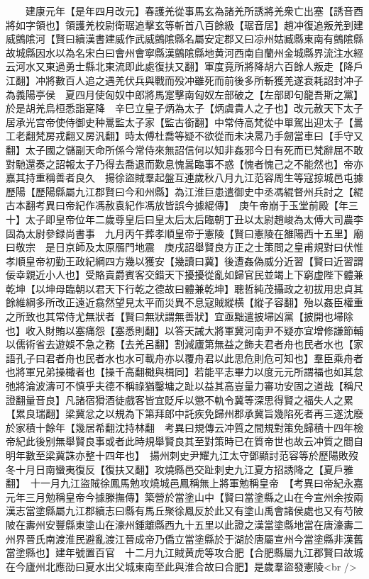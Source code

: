 　　建康元年【是年四月改元】春護羌從事馬玄為諸羌所誘將羌衆亡出塞【誘音酉將如字領也】領護羌校尉衛琚追擊玄等斬首八百餘級【琚音居】趙冲復追叛羌到建威鸇隂河【賢曰續漢書建威作武威鸇隂縣名屬安定郡又曰凉州姑臧縣東南有鸇隂縣故城縣因水以為名宋白曰會州會寧縣漢鸇隂縣地黄河西南自蘭州金城縣界流注水經云河水又東過勇士縣北東流即此處復扶又翻】軍度竟所將降胡六百餘人叛走【降戶江翻】冲將數百人追之遇羌伏兵與戰而殁冲雖死而前後多所斬獲羌遂衰耗詔封冲子為義陽亭侯　夏四月使匈奴中郎將馬寔擊南匈奴左部破之【左部即句龍吾斯之黨】於是胡羌烏桓悉詣寔降　辛巳立皇子炳為太子【炳虞貴人之子也】改元赦天下太子居承光宫帝使侍御史种暠監太子家【監古銜翻】中常侍高梵從中單駕出迎太子【暠工老翻梵房戎翻又房汎翻】時太傅杜喬等疑不欲從而未决暠乃手劒當車曰【手守又翻】太子國之儲副天命所係今常侍來無詔信何以知非姦邪今日有死而已梵辭屈不敢對馳還奏之詔報太子乃得去喬退而歎息愧暠臨事不惑【愧者愧己之不能然也】帝亦嘉其持重稱善者良久　揚徐盜賊羣起盤互連歲秋八月九江范容周生等寇掠城邑屯據歷陽【歷陽縣屬九江郡賢曰今和州縣】為江淮巨患遣御史中丞馮緄督州兵討之【緄古本翻考異曰帝紀作馮赦袁紀作馮放皆誤今據緄傳】　庚午帝崩于玉堂前殿【年三十】太子即皇帝位年二歲尊皇后曰皇太后太后臨朝丁丑以太尉趙峻為太傅大司農李固為太尉參録尚書事　九月丙午葬孝順皇帝于憲陵【賢曰憲陵在雒陽西十五里】廟曰敬宗　是日京師及太原鴈門地震　庚戌詔舉賢良方正之士策問之皇甫規對曰伏惟孝順皇帝初勤王政紀綱四方幾以獲安【幾讀曰冀】後遭姦偽威分近習【賢曰近習謂佞幸親近小人也】受賂賣爵賓客交錯天下擾擾從亂如歸官民並竭上下窮虚陛下體兼乾坤【以坤母臨朝以君天下行乾之德故曰體兼乾坤】聰哲純茂攝政之初拔用忠貞其餘維綱多所改正遠近翕然望見太平而災異不息寇賊縱横【縱子容翻】殆以姦臣權重之所致也其常侍尤無狀者【賢曰無狀謂無善狀】宜亟黜遣披埽凶黨【披開也埽除也】收入財賄以塞痛怨【塞悉則翻】以答天誡大將軍冀河南尹不疑亦宜增修謙節輔以儒術省去遊娛不急之務【去羌呂翻】割減廬第無益之飾夫君者舟也民者水也【家語孔子曰君者舟也民者水也水可載舟亦以覆舟君以此思危則危可知也】羣臣乘舟者也將軍兄弟操檝者也【操千高翻檝與楫同】若能平志畢力以度元元所謂福也如其怠弛將淪波濤可不慎乎夫德不稱祿猶鑿墉之趾以益其高豈量力審功安固之道哉【稱尺證翻量音良】凡諸宿猾酒徒戲客皆宜貶斥以懲不軌令冀等深思得賢之福失人之累【累良瑞翻】梁冀忿之以規為下第拜郎中託疾免歸州郡承冀旨幾陷死者再三遂沈廢於家積十餘年【幾居希翻沈持林翻　考異曰規傳云冲質之間規對策免歸積十四年檢帝紀此後别無舉賢良事或者此時規舉賢良其至對策時已在質帝世也故云冲質之間自明年數至梁冀誅亦整十四年也】　揚州刺史尹耀九江太守鄧顯討范容等於歷陽敗歿　冬十月日南蠻夷復反【復扶又翻】攻燒縣邑交趾刺史九江夏方招誘降之【夏戶雅翻】　十一月九江盜賊徐鳳馬勉攻燒城邑鳳稱無上將軍勉稱皇帝　【考異曰帝紀永嘉元年三月勉稱皇帝今據滕撫傳】築營於當塗山中【賢曰當塗縣之山在今宣州余按兩漢志當塗縣屬九江郡續志曰縣有馬丘聚徐鳳反於此又有塗山禹會諸侯處也又有芍陂陂在夀州安豐縣東塗山在濠州鍾離縣西九十五里以此證之漢當塗縣地當在唐濠夀二州界晉氏南渡淮民避亂渡江晉成帝乃僑立當塗縣於于湖於唐屬宣州今當塗縣非漢舊當塗縣也】建年號置百官　十二月九江賊黄虎等攻合肥【合肥縣屬九江郡賢曰故城在今廬州北應劭曰夏水出父城東南至此與淮合故曰合肥】是歲羣盜發憲陵<br />
